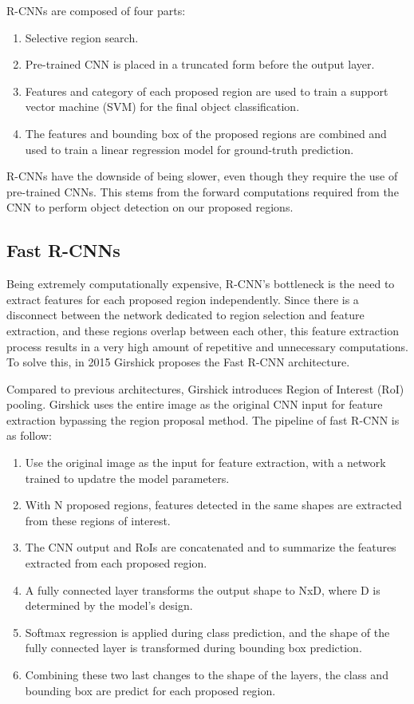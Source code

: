 \documentclass[12pt,a4paper,twocolumn,twoside]{article}
\begin{document}
R-CNNs are composed of four parts:
\begin{enumerate}
    \item Selective region search.
    \item Pre-trained CNN is placed in a truncated form before the output layer.
    \item Features and category of each proposed region are used to train a support vector machine (SVM) for the final object classification.
    \item The features and bounding box of the proposed regions are combined and used to train a linear regression model for ground-truth prediction.
\end{enumerate}

R-CNNs have the downside of being slower, even though they require the use of pre-trained CNNs. This stems from the forward computations required from the CNN to perform object detection on our proposed regions. 

\subsection{Fast R-CNNs}

Being extremely computationally expensive, R-CNN's bottleneck is the need to extract features for each proposed region independently. Since there is a disconnect between the network dedicated to region selection and feature extraction, and these regions overlap between each other, this feature extraction process results in a very high amount of repetitive and unnecessary computations. To solve this, in 2015  Girshick\cite{girshick_2015} proposes the Fast R-CNN architecture. 

Compared to previous architectures, Girshick introduces Region of Interest (RoI) pooling. Girshick uses the entire image as the original CNN input for feature extraction bypassing the region proposal method. The pipeline of fast R-CNN is as follow:

\begin{enumerate}
    \item Use the original image as the input for feature extraction, with a network trained to updatre the model parameters.
    \item With N proposed regions, features detected in the same shapes are extracted from these regions of interest. 
    \item The CNN output and RoIs are concatenated and to summarize the features extracted from each proposed region.
    \item A fully connected layer transforms the output shape to NxD, where D is determined by the model's design.
    \item Softmax regression is applied during class prediction, and the shape of the fully connected layer is transformed during bounding box prediction.
    \item Combining these two last changes to the shape of the layers, the class and bounding box are predict for each proposed region.
\end{enumerate}
\end{document}
